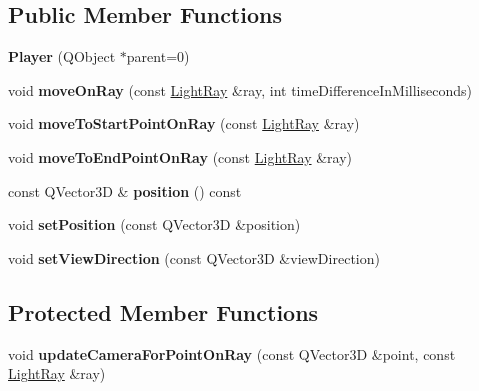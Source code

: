 \subsection*{Public Member Functions}
\begin{DoxyCompactItemize}
\item 
\hypertarget{class_player_a5c2a46dbacbc28b7cfbe352b6c0db644}{}{\bfseries Player} (Q\+Object $\ast$parent=0)\label{class_player_a5c2a46dbacbc28b7cfbe352b6c0db644}

\item 
\hypertarget{class_player_a6dcd0b9f4d678260314878ab20ce6e09}{}void {\bfseries move\+On\+Ray} (const \hyperlink{class_light_ray}{Light\+Ray} \&ray, int time\+Difference\+In\+Milliseconds)\label{class_player_a6dcd0b9f4d678260314878ab20ce6e09}

\item 
\hypertarget{class_player_a38269e0706f91b71c6e8f8373c397969}{}void {\bfseries move\+To\+Start\+Point\+On\+Ray} (const \hyperlink{class_light_ray}{Light\+Ray} \&ray)\label{class_player_a38269e0706f91b71c6e8f8373c397969}

\item 
\hypertarget{class_player_a0a4ebefb0f7593d79573ddcfe68e8e2f}{}void {\bfseries move\+To\+End\+Point\+On\+Ray} (const \hyperlink{class_light_ray}{Light\+Ray} \&ray)\label{class_player_a0a4ebefb0f7593d79573ddcfe68e8e2f}

\item 
\hypertarget{class_player_a0c307c67d3c6d64ee9c5b724c1e2b095}{}const Q\+Vector3\+D \& {\bfseries position} () const \label{class_player_a0c307c67d3c6d64ee9c5b724c1e2b095}

\item 
\hypertarget{class_player_a0cb33ddb87038b4e2af648e1b884d79f}{}void {\bfseries set\+Position} (const Q\+Vector3\+D \&position)\label{class_player_a0cb33ddb87038b4e2af648e1b884d79f}

\item 
\hypertarget{class_player_ae51ad40372e26d33351c02d77a1aba63}{}void {\bfseries set\+View\+Direction} (const Q\+Vector3\+D \&view\+Direction)\label{class_player_ae51ad40372e26d33351c02d77a1aba63}

\end{DoxyCompactItemize}
\subsection*{Protected Member Functions}
\begin{DoxyCompactItemize}
\item 
\hypertarget{class_player_a557b70acbd3cb1f71218390f7e90105c}{}void {\bfseries update\+Camera\+For\+Point\+On\+Ray} (const Q\+Vector3\+D \&point, const \hyperlink{class_light_ray}{Light\+Ray} \&ray)\label{class_player_a557b70acbd3cb1f71218390f7e90105c}

\end{DoxyCompactItemize}
